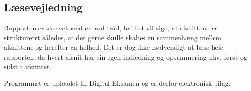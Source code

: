 \subsection{Læsevejledning}
Rapporten er skrevet med en rød tråd, hvilket vil sige, at afsnittene er struktureret således, at der gerne skulle skabes en sammenhæng mellem afsnittene og herefter en helhed. Det er dog ikke nødvendigt at læse hele rapporten, da hvert afsnit har sin egen indledning og opsummering hhv. først og sidst i afsnittet.

Programmet er uploadet til Digital Eksamen og er derfor elektronisk bilag. 




